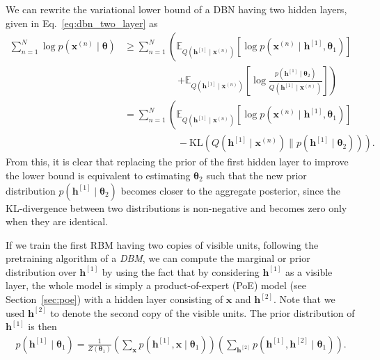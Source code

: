 \documentclass[dissertation,nocontribution,draft*]{aaltoseries}
\newcommand{\qlay}[1]{\left[#1\right]}
\newcommand{\vect}[1]{\mathbf{#1}}
\newcommand{\vects}[1]{\boldsymbol{#1}}
\newcommand{\vh}[0]{\vect{h}}
\newcommand{\vx}[0]{\vect{x}}
\newcommand{\TT}[0]{{\vects{\theta}}}
\newcommand{\KL}[0]{\text{KL}}
\newcommand{\E}[0]{\mathbb{E}}
\begin{document}
We can rewrite the variational lower bound of a 
DBN having two hidden layers, given in
Eq.~\eqref{eq:dbn_two_layer} as
\begin{align}
    \label{eq:dbn_two_layer2}
    \sum_{n=1}^N \log p(\vx^{(n)} \mid \TT) 
    &\geq 
    \sum_{n=1}^N \left(\E_{Q(\vh^{\qlay{1}} \mid \vx^{(n)})} \left[
    \log p(\vx^{(n)} \mid \vh^{\qlay{1}}, \TT_1) \right]
    \right.
    \nonumber \\
    &\phantom{= \sum_{n=1}^N (\E}\left.+\E_{Q(\vh^{\qlay{1}} \mid \vx^{(n)})} \left[ 
    \log \frac{p(\vh^{\qlay{1}} \mid
    \TT_2)}{Q(\vh^{\qlay{1}}\mid\vx^{(n)})}
    \right] \right)
    \nonumber \\
    &=\sum_{n=1}^N 
    \left(\E_{Q(\vh^{\qlay{1}} \mid \vx^{(n)})} \left[
    \log p(\vx^{(n)} \mid \vh^{\qlay{1}}, \TT_1) \right]
    \right.
    \nonumber \\
    &\phantom{=\sum_{n=1}^N (\E}- \left.\KL\left(
    Q(\vh^{\qlay{1}}\mid\vx^{(n)}) \| p(\vh^{\qlay{1}}\mid
    \TT_2) \right)
    \right).
\end{align}
From this, it is clear that replacing the prior of the first
hidden layer to improve the lower bound is equivalent to
estimating $\TT_2$ such that the new prior distribution
$p(\vh^{\qlay{1}}\mid\TT_2)$ becomes closer to the aggregate
posterior, since the KL-divergence between two distributions
is non-negative and becomes zero only when they are
identical.

If we train the first RBM having two copies of visible
units, following the pretraining algorithm of a
\textit{DBM}, we can compute the marginal or prior
distribution over $\vh^{\qlay{1}}$ by using the fact that by
considering $\vh^{\qlay{1}}$ as a visible layer, the whole model
is simply a product-of-expert (PoE) model (see
Section~\ref{sec:poe}) with a hidden layer consisting of
$\vx$ and $\vh^{\qlay{2}}$. Note that we used $\vh^{\qlay{2}}$ to
denote the second copy of the visible units. The prior
distribution of $\vh^{\qlay{1}}$ is then
\begin{align}
    \label{eq:dbm_prior1}
    p(\vh^{\qlay{1}} \mid \TT_1) = \frac{1}{Z(\TT_1)} \left(
    \sum_{\vx} p(\vh^{\qlay{1}}, \vx \mid \TT_1) \right) \left(
    \sum_{\vh^{\qlay{2}}} p(\vh^{\qlay{1}}, \vh^{\qlay{2}} \mid \TT_1)
    \right).
\end{align}
\end{document}
